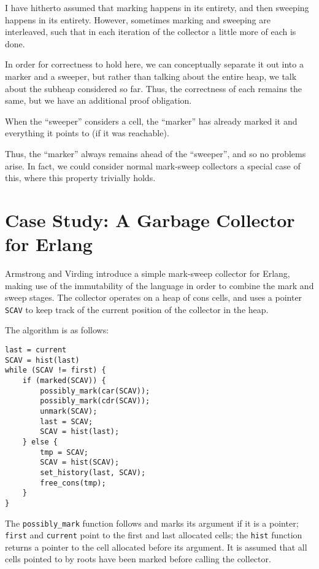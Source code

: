I have hitherto assumed that marking happens in its entirety, and then
sweeping happens in its entirety. However, sometimes marking and
sweeping are interleaved, such that in each iteration of the collector
a little more of each is done.

In order for correctness to hold here, we can conceptually separate it
out into a marker and a sweeper, but rather than talking about the
entire heap, we talk about the subheap considered so far. Thus, the
correctness of each remains the same, but we have an additional proof
obligation.

\begin{definition}
  \label{def:ms-interleaved}
  When the ``sweeper'' considers a cell, the ``marker'' has already
  marked it and everything it points to (if it was reachable).
\end{definition}

Thus, the ``marker'' always remains ahead of the ``sweeper'', and so
no problems arise. In fact, we could consider normal \gls{mark-sweep}
\glspl{collector} a special case of this, where this property
trivially holds.

\section{Case Study: A Garbage Collector for Erlang}
\label{sec:marksweep-example}

Armstrong and Virding\cite{Armstrong95} introduce a simple
\gls{mark-sweep} \gls{collector} for Erlang, making use of the
immutability of the language in order to combine the mark and sweep
stages. The \gls{collector} operates on a \gls{heap} of cons cells,
and uses a \gls{pointer} \texttt{SCAV} to keep track of the current
position of the \gls{collector} in the heap.

The algorithm is as follows:

\begin{lstlisting}
last = current
SCAV = hist(last)
while (SCAV != first) {
    if (marked(SCAV)) {
        possibly_mark(car(SCAV));
        possibly_mark(cdr(SCAV));
        unmark(SCAV);
        last = SCAV;
        SCAV = hist(last);
    } else {
        tmp = SCAV;
        SCAV = hist(SCAV);
        set_history(last, SCAV);
        free_cons(tmp);
    }
}
\end{lstlisting}

The \texttt{possibly\_mark} function follows and marks its argument if
it is a pointer; \texttt{first} and \texttt{current} point to the
first and last allocated \glspl{cell}; the \texttt{hist} function
returns a \gls{pointer} to the \gls{cell} allocated before its
argument. It is assumed that all cells pointed to by roots have been
marked before calling the collector.

